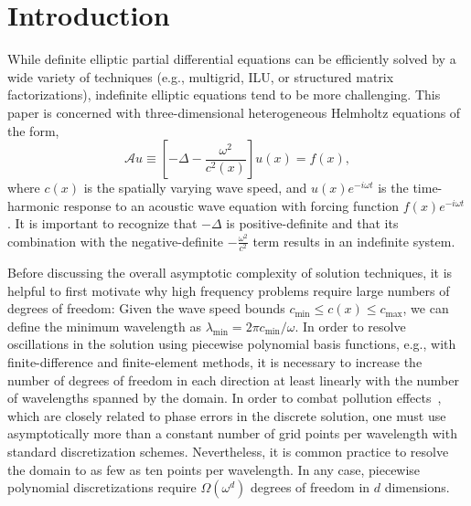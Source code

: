 


\section{Introduction}
\label{section:intro}
While definite elliptic partial differential equations can be efficiently 
solved by a wide variety of techniques (e.g., multigrid, ILU, or structured 
matrix factorizations), indefinite elliptic equations tend to be more 
challenging. 
This paper is concerned with three-dimensional heterogeneous Helmholtz 
equations of the form,
\begin{equation}\label{helmholtz}
  \mathcal{A} u \equiv 
  \left[-\Delta - \frac{\omega^2}{c^2(x)}\right] u(x) =f(x),
\end{equation}
where $c(x)$ is the spatially varying wave speed, and $u(x) e^{-i \omega t}$ 
is the time-harmonic response to an acoustic wave equation with forcing 
function $f(x) e^{-i \omega t}$.
It is important to recognize that $-\Delta$ is positive-definite and that 
its combination with the negative-definite $-\frac{\omega^2}{c^2}$ term 
results in an indefinite system.

Before discussing the overall asymptotic complexity of solution techniques,
it is helpful to first motivate why high frequency problems require large 
numbers of degrees of freedom: Given the wave speed bounds 
$c_{\text{min}} \le c(x) \le c_{\text{max}}$, we can define the minimum 
wavelength as $\lambda_{\text{min}} = 2 \pi c_{\text{min}}/\omega$.
In order to resolve oscillations in the solution using piecewise polynomial 
basis functions, e.g., with finite-difference and finite-element methods, it is 
necessary to increase the number of degrees of freedom in each direction at 
least linearly with the number of wavelengths spanned by the domain. In order
to combat pollution effects~\cite{Babuska-pollution}, which are closely related 
to phase errors in the discrete solution, one must use asymptotically more
than a constant number of grid points per wavelength with standard 
discretization schemes. Nevertheless, it is common practice to resolve the 
domain to as few as ten points per wavelength. 
In any case, piecewise polynomial discretizations require $\Omega(\omega^d)$
degrees of freedom in $d$ dimensions.

